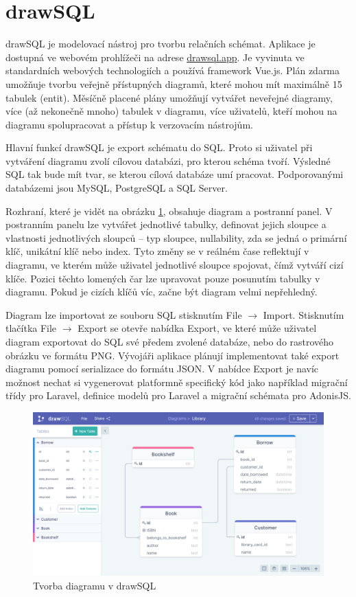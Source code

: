 \section{drawSQL}

drawSQL je modelovací nástroj pro tvorbu relačních schémat. Aplikace je dostupná
ve webovém prohlížeči na adrese \url{drawsql.app}. Je vyvinuta ve standardních
webových technologiích a používá framework Vue.js. Plán zdarma umožňuje tvorbu
veřejně přístupných diagramů, které mohou mít maximálně 15 tabulek (entit).
Měsíčně placené plány umožňují vytvářet neveřejné diagramy, více (až nekonečně
mnoho) tabulek v diagramu, více uživatelů, kteří mohou na diagramu spolupracovat
a přístup k verzovacím nástrojům.

Hlavní funkcí drawSQL je export schématu do SQL. Proto si uživatel při vytváření
diagramu zvolí cílovou databázi, pro kterou schéma tvoří. Výsledné SQL tak bude
mít tvar, se kterou cílová databáze umí pracovat. Podporovanými databázemi jsou
MySQL, PostgreSQL a SQL Server.

Rozhraní, které je vidět na obrázku \ref{fig:drawsql}, obsahuje diagram a
postranní panel. V postranním panelu lze vytvářet jednotlivé tabulky, definovat
jejich sloupce a vlastnosti jednotlivých sloupců -- typ sloupce, nullability,
zda se jedná o primární klíč, unikátní klíč nebo index. Tyto změny se v reálném
čase reflektují v diagramu, ve kterém může uživatel jednotlivé sloupce spojovat,
čímž vytváří cizí klíče. Pozici těchto lomených čar lze upravovat pouze
posunutím tabulky v diagramu. Pokud je cizích klíčů víc, začne být diagram velmi
nepřehledný.

Diagram lze importovat ze souboru SQL stisknutím File $\rightarrow$ Import.
Stisknutím tlačítka File $\rightarrow$ Export se otevře nabídka Export, ve které
může uživatel diagram exportovat do SQL své předem zvolené databáze, nebo do
rastrového obrázku ve formátu PNG. Vývojáři aplikace plánují implementovat také
export diagramu pomocí serializace do formátu JSON. V nabídce Export je navíc
možnost nechat si vygenerovat platformně specifický kód jako například migrační
třídy pro Laravel, definice modelů pro Laravel a migrační schémata pro AdonisJS.

\begin{figure}
  \centering
  \includegraphics[width=\textwidth]{../img/drawsql.png}
  \caption{Tvorba diagramu v drawSQL}
  \label{fig:drawsql}
\end{figure}


